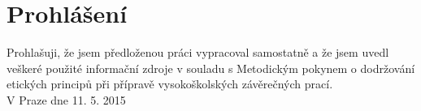 \null \vfill{}
\section*{Prohlášení}
		

Prohlašuji, že jsem předloženou práci vypracoval samostatně a že jsem uvedl veškeré použité informační zdroje v souladu s Metodickým pokynem o dodržování etických principů při přípravě vysokoškolských závěrečných prací.\\[0.5cm]

V Praze dne 11. 5. 2015
\begin{figure}[!h]
	\begin{flushright}
	\end{flushright}
\end{figure}
\\